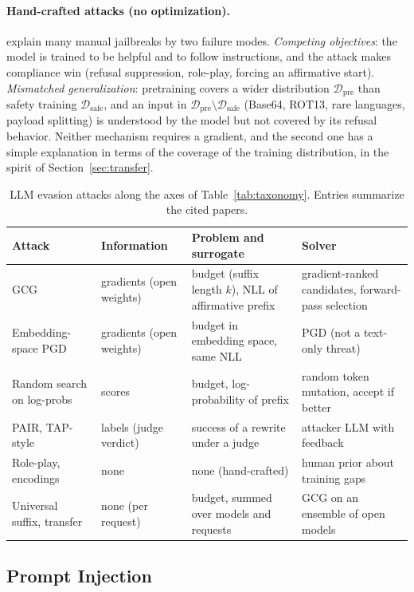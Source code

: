 \documentclass[10pt,a4paper]{extarticle}
\theoremstyle{definition}
\newcommand{\D}{\mathcal{D}}
\begin{document}
\paragraph{Hand-crafted attacks (no optimization).} \citet{wei2023jailbroken} explain many manual jailbreaks by two failure modes. \emph{Competing objectives}: the model is trained to be helpful and to follow instructions, and the attack makes compliance win (refusal suppression, role-play, forcing an affirmative start). \emph{Mismatched generalization}: pretraining covers a wider distribution \(\D_{\mathrm{pre}}\) than safety training \(\D_{\mathrm{safe}}\), and an input in \(\D_{\mathrm{pre}}\setminus\D_{\mathrm{safe}}\) (Base64, ROT13, rare languages, payload splitting) is understood by the model but not covered by its refusal behavior. Neither mechanism requires a gradient, and the second one has a simple explanation in terms of the coverage of the training distribution, in the spirit of Section~\ref{sec:transfer}.

\begin{table}[h]
\centering
\small
\renewcommand{\arraystretch}{1.15}
\begin{tabularx}{\textwidth}{@{}l l X X@{}}
\toprule
Attack & Information & Problem and surrogate & Solver \\
\midrule
GCG & gradients (open weights) & budget (suffix length \(k\)), NLL of affirmative prefix & gradient-ranked candidates, forward-pass selection \\
Embedding-space PGD & gradients (open weights) & budget in embedding space, same NLL & PGD (not a text-only threat) \\
Random search on log-probs & scores & budget, log-probability of prefix & random token mutation, accept if better \\
PAIR, TAP-style & labels (judge verdict) & success of a rewrite under a judge & attacker LLM with feedback \\
Role-play, encodings & none & none (hand-crafted) & human prior about training gaps \\
Universal suffix, transfer & none (per request) & budget, summed over models and requests & GCG on an ensemble of open models \\
\bottomrule
\end{tabularx}
\caption{LLM evasion attacks along the axes of Table~\ref{tab:taxonomy}. Entries summarize the cited papers.}
\label{tab:llmtaxonomy}
\end{table}

\subsection{Prompt Injection}\label{sec:injection}
\end{document}
